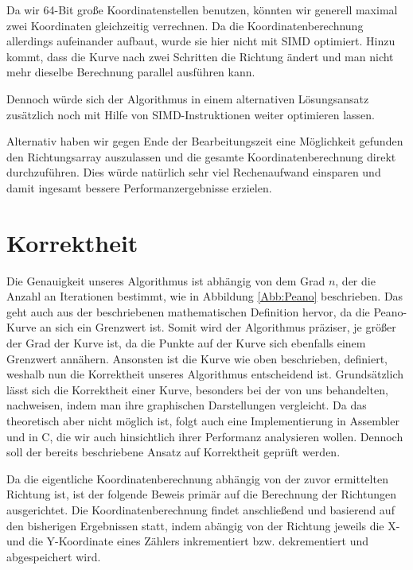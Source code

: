 \documentclass[course=asp]{aspdoc}
\begin{document}
Da wir 64-Bit gro\ss e Koordinatenstellen benutzen, k\"onnten wir generell maximal zwei Koordinaten gleichzeitig verrechnen. Da die Koordinatenberechnung allerdings aufeinander aufbaut, wurde sie hier nicht mit SIMD optimiert. Hinzu kommt, dass die Kurve nach zwei Schritten die Richtung \"andert und man nicht mehr dieselbe Berechnung parallel ausf\"uhren kann.

Dennoch w\"urde sich der Algorithmus in einem alternativen L\"osungsansatz zus\"atzlich noch mit Hilfe von SIMD-Instruktionen weiter optimieren lassen.  

Alternativ haben wir gegen Ende der Bearbeitungszeit eine M\"oglichkeit gefunden den Richtungsarray auszulassen und die gesamte Koordinatenberechnung direkt durchzuf\"uhren. Dies w\"urde nat\"urlich sehr viel Rechenaufwand einsparen und damit ingesamt bessere Performanzergebnisse erzielen.

\section{Korrektheit} \label{Korrektheit} %

Die Genauigkeit unseres Algorithmus ist abh\"angig von dem Grad $n$, der die Anzahl an Iterationen bestimmt, wie in Abbildung \ref{Abb:Peano} beschrieben. Das geht auch aus der beschriebenen mathematischen Definition hervor, da die Peano-Kurve an sich ein Grenzwert ist. Somit wird der Algorithmus pr\"aziser, je gr\"o\ss er der Grad der Kurve ist, da die Punkte auf der Kurve sich ebenfalls einem Grenzwert ann\"ahern. Ansonsten ist die Kurve wie oben beschrieben, definiert, weshalb nun die Korrektheit unseres Algorithmus entscheidend ist.
Grunds\"atzlich l\"asst sich die Korrektheit einer Kurve, besonders bei der von uns behandelten, nachweisen, indem man ihre graphischen Darstellungen vergleicht. Da das theoretisch aber nicht m\"oglich ist, folgt auch eine Implementierung in Assembler und in C, die wir auch hinsichtlich ihrer Performanz analysieren wollen.
Dennoch soll der bereits beschriebene Ansatz auf Korrektheit gepr\"uft werden.


Da die eigentliche Koordinatenberechnung abh\"angig von der zuvor ermittelten Richtung ist, ist der folgende Beweis prim\"ar auf die Berechnung der Richtungen ausgerichtet.
Die Koordinatenberechnung findet anschlie\ss end und basierend auf den bisherigen Ergebnissen statt, indem ab\"angig von der Richtung jeweils die X- und die Y-Koordinate eines Z\"ahlers inkrementiert bzw. dekrementiert und abgespeichert wird.
\end{document}

